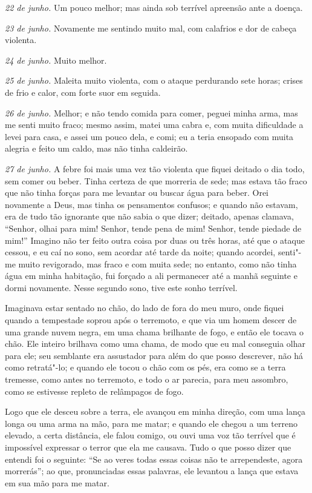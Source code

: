 \emph{22 de junho.} Um pouco melhor; mas ainda sob terrível apreensão
ante a doença.

\emph{23 de junho.} Novamente me sentindo muito mal, com calafrios e dor
de cabeça violenta.

\emph{24 de junho.} Muito melhor.

\emph{25 de junho.} Maleita muito violenta, com o ataque perdurando sete
horas; crises de frio e calor, com forte suor em seguida.

\emph{26 de junho.} Melhor; e não tendo comida para comer, peguei minha
arma, mas me senti muito fraco; mesmo assim, matei uma cabra e, com
muita dificuldade a levei para casa, e assei um pouco dela, e comi; eu a
teria ensopado com muita alegria e feito um caldo, mas não tinha
caldeirão.

\emph{27 de junho.} A febre foi mais uma vez tão violenta que fiquei
deitado o dia todo, sem comer ou beber. Tinha certeza de que morreria de
sede; mas estava tão fraco que não tinha forças para me levantar ou
buscar água para beber. Orei novamente a Deus, mas tinha os pensamentos
confusos; e quando não estavam, era de tudo tão ignorante que não sabia
o que dizer; deitado, apenas clamava, ``Senhor, olhai para mim! Senhor,
tende pena de mim! Senhor, tende piedade de mim!'' Imagino não ter feito
outra coisa por duas ou três horas, até que o ataque cessou, e eu caí no
sono, sem acordar até tarde da noite; quando acordei, senti"-me muito
revigorado, mas fraco e com muita sede; no entanto, como não tinha água
em minha habitação, fui forçado a ali permanecer até a manhã seguinte e
dormi novamente. Nesse segundo sono, tive este sonho terrível.

Imaginava estar sentado no chão, do lado de fora do meu muro, onde
fiquei quando a tempestade soprou após o terremoto, e que via um homem
descer de uma grande nuvem negra, em uma chama brilhante de fogo, e
então ele tocava o chão. Ele inteiro brilhava como uma chama, de modo
que eu mal conseguia olhar para ele; seu semblante era assustador para
além do que posso descrever, não há como retratá"-lo; e quando ele tocou
o chão com os pés, era como se a terra tremesse, como antes no
terremoto, e todo o ar parecia, para meu assombro, como se estivesse
repleto de relâmpagos de fogo.

Logo que ele desceu sobre a terra, ele avançou em minha direção, com uma
lança longa ou uma arma na mão, para me matar; e quando ele chegou a um
terreno elevado, a certa distância, ele falou comigo, ou ouvi uma voz
tão terrível que é impossível expressar o terror que ela me causava.
Tudo o que posso dizer que entendi foi o seguinte: ``Se ao veres todas
essas coisas não te arrependeste, agora morrerás''; ao que, pronunciadas
essas palavras, ele levantou a lança que estava em sua mão para me
matar.

